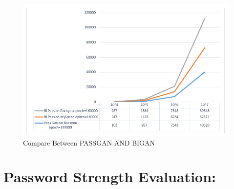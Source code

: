 \documentclass[runningheads]{llncs}
\begin{document}
{{\par
\newline
\begin{table}[htb]
\centering
\caption{Result of bipassgan using the rockyou data set in 160000 iteration}
\label{}
\end{table}

\newline
\begin{figure}[ht!] %
\centering
\begin{mdframed}
\includegraphics[width=4 in]{Compare.png}
\end{mdframed}
\caption{Compare Between PASSGAN AND BIGAN}
\label{LP}
\end{figure}
\newline
}
}
\newline
\section{Password Strength Evaluation:}
\end{document}
